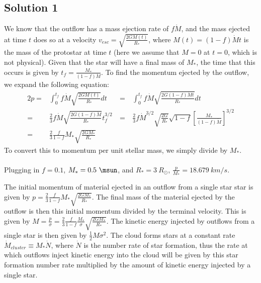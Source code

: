 \documentclass[11pt]{article}
\newenvironment{tight_enumerate}{
    \begin{enumerate}[label=(\alph*)]
    \setlength{\itemsep}{3pt}
    \setlength{\parskip}{0pt}}
    {\end{enumerate}}
\begin{document}
\subsection*{Solution 1}
\begin{tight_enumerate}
\item We know that the outflow has a mass ejection rate of $f\dot{M}$, and the mass ejected at time $t$ does so at a velocity $v_{esc} = \sqrt{\frac{2GM(t)}{R_{*}}}$, where $M(t) = (1-f)\dot{M}t$ is the mass of the protostar at time $t$ (here we assume that $M = 0$ at $t = 0$, which is not physical). Given that the star will have a final mass of $M_{*}$, the time that this occurs is given by $t_{f} = \frac{M_{*}}{(1-f)\dot{M}}$. To find the momentum ejected by the outflow, we expand the following equation:
\begin{alignat*}{2}
p = &\int_{0}^{t_{f}}f\dot{M}\sqrt{\frac{2GM(t)}{R_{*}}}dt\ &=\ &\int_{0}^{t_{f}}f\dot{M}\sqrt{\frac{2G(1-f)\dot{M}t}{R_{*}}}dt \\
  = &\frac{2}{3}f\dot{M}\sqrt{\frac{2G(1-f)\dot{M}}{R_{*}}}t_{f}^{3/2}\ &=\ &\frac{2}{3}f\dot{M}^{3/2}\sqrt{\frac{2G}{R_{*}}}\sqrt{1-f}\left[\frac{M_{*}}{(1-f)\dot{M}}\right]^{3/2} \\
  = &\frac{2}{3}\frac{f}{1-f}M_{*}\sqrt{\frac{2GM_{*}}{R_{*}}}
\end{alignat*}
To convert this to momentum per unit stellar mass, we simply divide by $M_{*}$.\\
\\
Plugging in $f = 0.1$, $M_{*} = 0.5\ \si{\msun}$, and $R_{*} = 3\ R_{\odot}$, $\frac{p}{M_{*}} = 18.679\ \si{km/s}$.

\item The initial momentum of material ejected in an outflow from a single star star is given by $p = \frac{2}{3}\frac{f}{1-f}M_{*}\sqrt{\frac{2GM_{*}}{R_{*}}}$. The final mass of the material ejected by the outflow is then this initial momentum divided by the terminal velocity. This is given by $M = \frac{p}{\sigma} = \frac{2}{3}\frac{f}{1-f}\frac{M_{*}}{\sigma}\sqrt{\frac{2GM_{*}}{R_{*}}}$. The kinetic energy injected by outflows from a single star is then given by $\frac{1}{2}M\sigma^{2}$. The cloud forms stars at a constant rate $\dot{M}_{cluster} \equiv M_{*}\dot{N}$, where $\dot{N}$ is the number rate of star formation, thus the rate at which outflows inject kinetic energy into the cloud will be given by this star formation number rate multiplied by the amount of kinetic energy injected by a single star.\\


\end{tight_enumerate}
\end{document}
